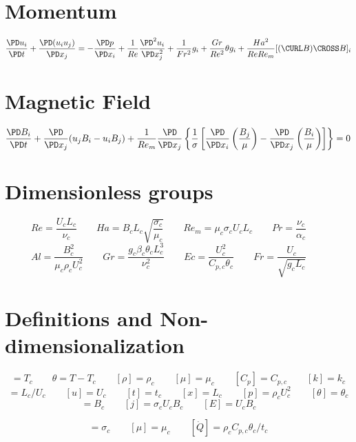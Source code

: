 \documentclass[11pt]{article}
\begin{document}
\section{Momentum}
\begin{equation}
	\frac{\PD u_i}{\PD t} +
	\frac{\PD (u_i u_j)}{\PD x_j}
	=
	- \frac{\PD p}{\PD x_i}
	+ \frac{1}{Re}
	\frac{\PD^2 u_i}{\PD x_j^2}
	+ \frac{1}{Fr^2}
	g_i
	+ \frac{Gr}{Re^2}
	\theta g_i
	+ \frac{Ha^2}{Re Re_m}
	[(\CURL B) \CROSS B]_i
\end{equation}
\section{Magnetic Field}
\begin{equation}
	\frac{\PD B_i}{\PD t}
	+ \frac{\PD}{\PD x_j} (u_j B_i - u_i B_j)
	+ \frac{1}{Re_m}
	\frac{\PD}{\PD x_j}
	\left\{ \frac{1}{\sigma}
	\left[
	\frac{\PD}{\PD x_i}
	\left( \frac{B_j}{\mu} \right) -
	\frac{\PD}{\PD x_j}
	\left( \frac{B_i}{\mu} \right)
	\right]
	\right\} = 0
\end{equation}

\section{Dimensionless groups}
\begin{equation}
	Re = \frac{U_c L_c}{\nu_c} \qquad
	Ha = B_c L_c \sqrt{\frac{\sigma_c}{\mu_c}} \qquad
	Re_m = \mu_c \sigma_c U_c L_c \qquad
	Pr = \frac{\nu_c}{\alpha_c} \qquad
\end{equation}
\begin{equation}
	Al = \frac{B_c^2}{\mu_c \rho_c U_c^2} \qquad
	Gr = \frac{g_c \beta_c \theta_c L_c^3}{\nu_c^2} \qquad
	Ec = \frac{U_c^2}{C_{p,c} \theta_c} \qquad
	Fr = \frac{U_c}{\sqrt{g_c L_c}} \qquad
\end{equation}
\section{Definitions and Non-dimensionalization}
\begin{equation}
	[T] = T_c \qquad
	\theta = T-T_c \qquad
	[\rho] = \rho_c \qquad
	[\mu] = \mu_c \qquad
	[C_p] = C_{p,c} \qquad
	[k] = k_c
\end{equation}
\begin{equation}
	[t_c] = L_c/U_c \qquad
	[u] = U_c \qquad
	[t] = t_c \qquad
	[x] = L_c \qquad
	[p] = \rho_c U_c^2 \qquad
	[\theta] = \theta_c
\end{equation}
\begin{equation}
	[B] = B_c  \qquad
	[j] = \sigma_c U_c B_c \qquad
	[E] = U_c B_c \qquad
\end{equation}

\begin{equation}
	[\sigma] = \sigma_c \qquad
	[\mu] = \mu_c \qquad
	[\dot{Q}] = \rho_c C_{p,c} \theta_c / t_c
\end{equation}
\end{document}
